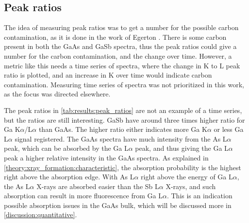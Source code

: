 \subsection{Peak ratios}
\label{discussion:peak_ratios}

The idea of measuring peak ratios was to get a number for the possible carbon contamination, as it is done in the work of Egerton \cite{egerton_nio_characterization_1994}.
There is some carbon present in both the GaAs and GaSb spectra, thus the peak ratios could give a number for the carbon contamination, and the change over time.
However, a metric like this needs a time series of spectra, where the change in K to L peak ratio is plotted, and an increase in K over time would indicate carbon contamination.
Measuring time series of spectra was not prioritized in this work, as the focus was directed elsewhere.

The peak ratios in \cref{tab:results:peak_ratios} are not an example of a time series, but the ratios are still interesting.
GaSb have around three times higher ratio for Ga K$\alpha$/L$\alpha$ than GaAs.
The higher ratio either indicates more Ga K$\alpha$ or less Ga L$\alpha$ signal registered.
The GaAs spectra have much intensity from the As L$\alpha$ peak, which can be absorbed by the Ga L$\alpha$ peak, and thus giving the Ga L$\alpha$ peak a higher relative intensity in the GaAs spectra.
As explained in \cref{theory:xray_formation:characteristic}, the absorption probability is the highest right above the absorption edge.
With As L$\alpha$ right above the energy of Ga L$\alpha$, the As L$\alpha$ X-rays are absorbed easier than the Sb L$\alpha$ X-rays, and such absorption can result in more fluorescence from Ga L$\alpha$.
This is an indication possible absorption issues in the GaAs bulk, which will be discussed more in \cref{discussion:quantitative}.



